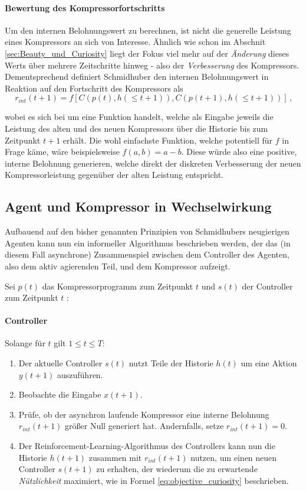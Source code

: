 \paragraph{Bewertung des Kompressorfortschritts}
\label{sec:KompressorProgress}
Um den internen Belohnungswert zu berechnen, ist nicht die generelle Leistung eines Kompressors an sich von Interesse. Ähnlich wie schon im Abschnit \ref{sec:Beauty_und_Curiosity} liegt der Fokus viel mehr auf der \emph{Änderung} dieses Werts über mehrere Zeitschritte hinweg - also der \emph{Verbesserung} des Kompressors.
Dementsprechend definiert Schmidhuber den internen Belohnungswert in Reaktion auf den Fortschritt des Kompressors als 
\begin{equation}
  r_{int}(t+1) = f\left[C(p(t),h(\leq t+1)), C(p(t+1),h(\leq t+1))\right] \, \text{,}
\end{equation}

wobei es sich bei um eine Funktion handelt, welche als Eingabe jeweils die Leistung des alten und des neuen Kompressors über die Historie bis zum Zeitpunkt \(t+1\)
erhält. Die wohl einfachste Funktion, welche potentiell für \(f\) in Frage käme, wäre beispielsweise \(f(a,b) = a - b\). Diese würde also eine positive, interne Belohnung generieren, welche direkt der diskreten Verbesserung der neuen Kompressorleistung gegenüber der alten Leistung entspricht.\cite[p.~19]{curiosity_schmidhuber}
\subsection{Agent und Kompressor in Wechselwirkung}

Aufbauend auf den bisher genannten Prinzipien von Schmidhubers neugierigen Agenten kann nun ein informeller Algorithmus beschrieben werden, der das (in diesem Fall asynchrone) Zusammenspiel zwischen dem Controller des Agenten, also dem aktiv agierenden Teil, und dem Kompressor aufzeigt.

Sei \(p(t)\) das Kompressorprogramm zum Zeitpunkt \(t\) und \(s(t)\) der Controller zum Zeitpunkt \(t\) \cite[p.~20]{curiosity_schmidhuber}:

\paragraph{Controller} Solange für  \(t\) gilt \(1 \leq t \leq T\): 
\begin{enumerate}
  \item Der aktuelle Controller \(s(t)\) nutzt Teile der Historie \(h(t)\) um eine Aktion \(y(t+1)\) auszuführen.
  \item Beobachte die Eingabe \(x(t+1)\).
  \item Prüfe, ob der asynchron laufende Kompressor eine interne Belohnung \(r_{int}(t+1)\) größer Null generiert hat. Andernfalls, setze \(r_{int}(t+1) = 0\).
  \item Der Reinforcement-Learning-Algorithmus des Controllers kann nun die Historie \(h(t+1)\) zusammen mit \(r_{int}(t+1)\) nutzen, um einen neuen Controller \(s(t+1)\) zu erhalten, der wiederum die zu erwartende \emph{Nützlichkeit} maximiert, wie in Formel \eqref{eq:objective_curiosity} beschrieben.
\end{enumerate}

